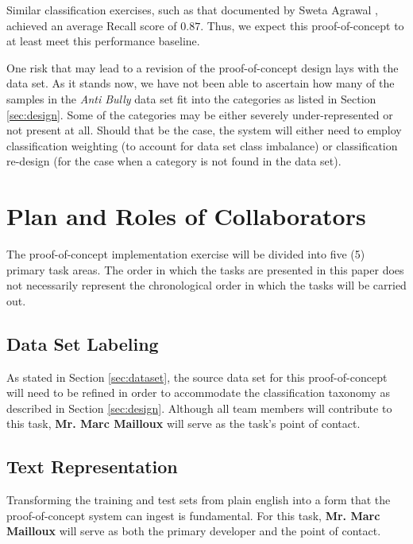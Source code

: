 \documentclass[conference]{sig-alternate-05-2015}
\begin{document}
Similar classification exercises, such as that documented by Sweta Agrawal
\cite{agrawal2018deep}, achieved an average Recall score of \( 0.87 \). Thus,
we expect this proof-of-concept to at least meet this performance baseline.

One risk that may lead to a revision of the proof-of-concept design lays with
the data set. As it stands now, we have not been able to ascertain how many of the
samples in the \textit{Anti Bully} data set fit into the categories as listed in
Section \ref{sec:design}. Some of the categories may be either severely
under-represented or not present at all. Should that be the case, the system
will either need to employ classification weighting (to account for data set
class imbalance) or classification re-design (for the case when a category is
not found in the data set).

\section{Plan and Roles of Collaborators}\label{sec:plan_roles}
The proof-of-concept implementation exercise will be divided into five (5)
primary task areas. The order in which the tasks are presented in this paper
does not necessarily represent the chronological order in which the tasks will
be carried out.

\subsection{Data Set Labeling}\label{sec:labeling_task}
As stated in Section \ref{sec:dataset}, the source data set for this
proof-of-concept will need to be refined in order to accommodate the
classification taxonomy as described in Section \ref{sec:design}. Although all
team members will contribute to this task, \textbf{Mr. Marc Mailloux} will serve
as the task's point of contact.

\subsection{Text Representation}\label{sec:tokenization_task}
Transforming the training and test sets from plain english into a form that the
proof-of-concept system can ingest is fundamental. For this task,
\textbf{Mr. Marc Mailloux} will serve as both the primary developer and the
point of contact.
\end{document}
